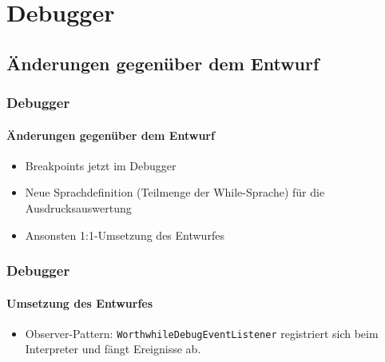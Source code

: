 \section{Debugger}

\subsection{Änderungen gegenüber dem Entwurf}
\begin{frame}
\frametitle{Debugger}
\framesubtitle{Änderungen gegenüber dem Entwurf}
\begin{itemize}
	\item<+-> Breakpoints jetzt im Debugger
	\item<+-> Neue Sprachdefinition (Teilmenge der While-Sprache) für die Ausdrucksauswertung
	\item<+-> Ansonsten 1:1-Umsetzung des Entwurfes
\end{itemize}
\end{frame}

\begin{frame}
\frametitle{Debugger}
\framesubtitle{Umsetzung des Entwurfes}
\begin{itemize}
	\item<+-> Observer-Pattern: \texttt{WorthwhileDebugEventListener} registriert sich beim Interpreter und fängt Ereignisse ab.
\end{itemize}
\end{frame}

